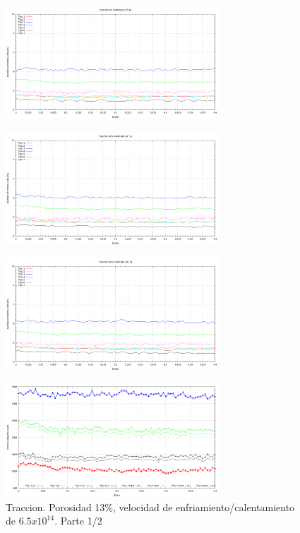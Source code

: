 \documentclass[10pt, oneside]{article} %
\begin{document}
\begin{figure}[H]
\centering
\includegraphics[width=8cm]{Figures/Porosidad_2vel_trac_voronoi4.png}
\caption{}
\end{figure}

\begin{figure}[H]
\centering
\includegraphics[width=8cm]{Figures/Porosidad_2vel_trac_voronoi5.png}
\caption{}
\end{figure}

\begin{figure}[H]
\centering
\includegraphics[width=8cm]{Figures/Porosidad_2vel_trac_voronoi6.png}
\caption{}
\label{fg:9trac}
\end{figure}

\begin{figure}[H]
\centering
\includegraphics[width=8cm]{Figures/Porosidad_2vel_voronoi_13_14_trac.png}
\caption{Traccion. Porosidad 13\%, velocidad de enfriamiento/calentamiento de $6.5x10^{14}$. Parte 1/2}
\label{fg:10trac}
\end{figure}
\end{document}
